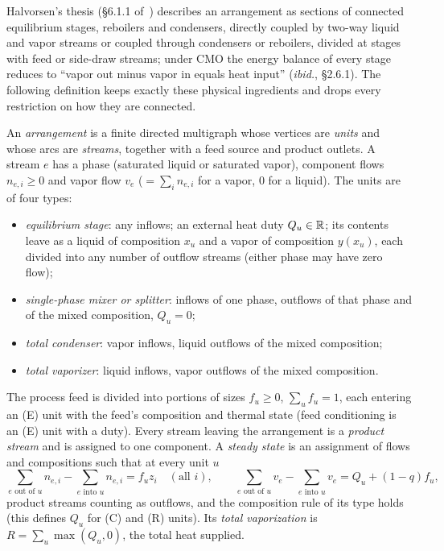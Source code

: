 \documentclass[11pt,a4paper]{report}
\newcommand{\cA}{\mathcal A}
\begin{document}
Halvorsen's thesis (\S6.1.1 of~\autocite{HalvorsenThesis}) describes an arrangement as sections of connected equilibrium
stages, reboilers and condensers, directly coupled by two-way liquid and vapor streams or coupled through condensers or
reboilers, divided at stages with feed or side-draw streams; under CMO the energy balance of every stage reduces to
``vapor out minus vapor in equals heat input'' (\emph{ibid.}, \S2.6.1). The following definition keeps exactly these
physical ingredients and drops every restriction on how they are connected.

\begin{definition}[the class \(\cA\)]\label{def:A}
An \emph{arrangement} is a finite directed multigraph whose vertices are \emph{units} and whose arcs are
\emph{streams}, together with a feed source and product outlets. A stream \(e\) has a phase (saturated liquid or saturated
vapor), component flows \(n_{e,i}\ge0\) and vapor flow \(v_e\) (\(=\sum_in_{e,i}\) for a vapor, \(0\) for a liquid). The
units are of four types:
\begin{itemize}
\item[(E)] \emph{equilibrium stage}: any inflows; an external heat duty \(Q_u\in\mathbb{R}\); its contents leave as a liquid of
composition \(x_u\) and a vapor of composition \(y(x_u)\), each divided into any number of outflow streams (either phase may
have zero flow);
\item[(M)] \emph{single-phase mixer or splitter}: inflows of one phase, outflows of that phase and of the mixed
composition, \(Q_u=0\);
\item[(C)] \emph{total condenser}: vapor inflows, liquid outflows of the mixed composition;
\item[(R)] \emph{total vaporizer}: liquid inflows, vapor outflows of the mixed composition.
\end{itemize}
The process feed is divided into portions of sizes \(f_u\ge0\), \(\sum_uf_u=1\), each entering an (E) unit with the
feed's composition and thermal state (feed conditioning is an (E) unit with a duty). Every stream leaving the arrangement is a \emph{product stream} and is assigned to one
component. A \emph{steady state} is an assignment of flows and compositions such that at every unit \(u\)
\begin{equation}\label{eq:balances}
\sum_{e\text{ out of }u}n_{e,i}-\sum_{e\text{ into }u}n_{e,i}=f_uz_i\quad(\text{all }i),\qquad
\sum_{e\text{ out of }u}v_e-\sum_{e\text{ into }u}v_e=Q_u+(1-q)f_u ,
\end{equation}
product streams counting as outflows, and the composition rule of its type holds (this defines \(Q_u\) for (C) and (R)
units). Its \emph{total vaporization} is \(R=\sum_u\max(Q_u,0)\), the total heat supplied.
\end{definition}
\end{document}
